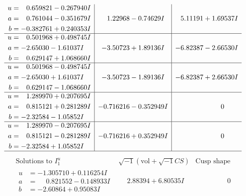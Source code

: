 \documentclass[1p]{elsarticle_modified}
\theoremstyle{definition}
\newcommand{\I}{\sqrt{-1}}
\begin{document}
$$\begin{array}{c|c|c}
\begin{aligned}
u &= \phantom{-}0.659821 - 0.267940 I \\
a &= \phantom{-}0.761044 - 0.351679 I \\
b &= -0.382761 + 0.240353 I\end{aligned}
 & \phantom{-}1.22968 - 0.74629 I & \phantom{-}5.11191 + 1.69537 I \\ \hline\begin{aligned}
u &= \phantom{-}0.501968 + 0.498745 I \\
a &= -2.65030 - 1.61037 I \\
b &= \phantom{-}0.629147 + 1.068660 I\end{aligned}
 & -3.50723 + 1.89136 I & -6.82387 - 2.66530 I \\ \hline\begin{aligned}
u &= \phantom{-}0.501968 - 0.498745 I \\
a &= -2.65030 + 1.61037 I \\
b &= \phantom{-}0.629147 - 1.068660 I\end{aligned}
 & -3.50723 - 1.89136 I & -6.82387 + 2.66530 I \\ \hline\begin{aligned}
u &= \phantom{-}1.289970 + 0.207695 I \\
a &= \phantom{-}0.815121 + 0.281289 I \\
b &= -2.32584 - 1.05852 I\end{aligned}
 & -0.716216 - 0.352949 I & \phantom{-0.000000 } 0 \\ \hline\begin{aligned}
u &= \phantom{-}1.289970 - 0.207695 I \\
a &= \phantom{-}0.815121 - 0.281289 I \\
b &= -2.32584 + 1.05852 I\end{aligned}
 & -0.716216 + 0.352949 I & \phantom{-0.000000 } 0\\
 \hline 
 \end{array}$$\newpage$$\begin{array}{c|c|c}  
\text{Solutions to }I^u_{1}& \I (\text{vol} + \sqrt{-1}CS) & \text{Cusp shape}\\
 \hline 
\begin{aligned}
u &= -1.305710 + 0.116254 I \\
a &= \phantom{-}0.821552 - 0.148933 I \\
b &= -2.60864 + 0.95083 I\end{aligned}
 & \phantom{-}2.88394 + 6.80535 I & \phantom{-0.000000 } 0 \\ \hline\begin{aligned}

\end{aligned}
\end{array}$$
\end{document}
